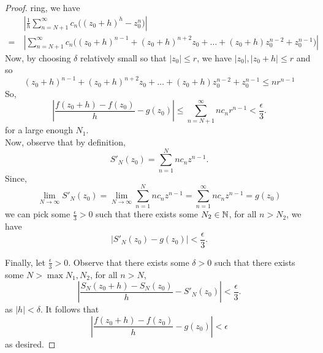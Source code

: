 \documentclass[11pt]{article}
\begin{document}
\begin{proof}
	ring, we have
	\begin{align*}
		&\>\left|\frac{1}{h} \sum^\infty_{n=N+1}c_n \big((z_0+h)^h
	-z_0^n\big)\right|\\ =&\>
	\left|\sum^{\infty}_{n=N+1}c_n\big((z_0+h)^{n-1} +
	(z_0+h)^{n+2}z_0 + \dots + (z_0+h)z_0^{n-2} + z_0^{n-1}\big)\right|
\end{align*}
Now, by choosing $\delta$ relatively small so that $|z_0|\leq r $, we have
$|z_0|, |z_0+h| \leq r$ and so
\begin{equation*}
	(z_0+h)^{n-1} + (z_0+h)^{n+2}z_0 + \dots + (z_0+h)z_0^{n-2} + z_0^{n-1}
	\leq nr^{n-1}
\end{equation*}
So,
\begin{equation*}
	\left|\frac{f(z_0+h) - f(z_0)}{h} - g(z_0)\right| \leq
	\sum^\infty_{n=N+1}nc_nr^{n-1} < \frac{\epsilon}{3}.
\end{equation*}
for a large enough $N_1$.\\

Now, observe that by definition,
\begin{equation*}
	S'_N(z_0) = \sum^N_{n=1} nc_nz^{n-1}.
\end{equation*}
Since,
\begin{equation*}
	\lim_{N\to\infty} S'_N(z_0)
	= \lim_{N\to\infty} \sum^N_{n=1} nc_nz^{n-1}
	= \sum^\infty_{n=1} nc_nz^{n-1}
	= g(z_0)
\end{equation*}
we can pick some $\frac{\epsilon}{3} >0$ such that there exists some
$N_2\in\mathbb{N}$, for all $n > N_2$, we have
\begin{equation*}
	|S'_N(z_0) - g(z_0)| < \frac{\epsilon}{3}.
\end{equation*}

Finally, let $\frac{\epsilon}{3} > 0$. Observe that there exists some
$\delta > 0$ such that there exists some $N > \max{N_1,N_2}$, for all $n >
N$,
\begin{equation*}
	\left|\frac{S_N(z_0+h) - S_N(z_0)}{h} - S'_N(z_0)\right| <
	\frac{\epsilon}{3}.
\end{equation*}
as $|h| < \delta$. It follows that
\begin{equation*}
	\left|\frac{f(z_0+h) - f(z_0)}{h} - g(z_0)\right| < \epsilon
\end{equation*}
as desired.
\end{proof}
\end{document}
